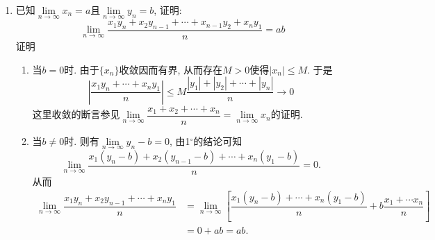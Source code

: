 \documentclass[UTF8,a4paper,20pt]{article}
\begin{document}
\begin{enumerate}
\item 已知$\lim\limits_{n\to\infty}x_n=a$且$\lim\limits_{n\to\infty}y_n=b$, 证明:
\[\lim\limits_{n\to\infty}\dfrac{x_1y_n+x_2y_{n-1}+\cdots+x_{n-1}y_2+x_ny_1}{n}=ab\]
{\heiti 证明}\\
\begin{enumerate}[1$^{\circ}$]
\item 当$b=0$时. 由于$\{x_n\}$收敛因而有界, 从而存在$M>0$使得$|x_n|\leqslant M$. 于是
\[ \left|\dfrac{x_1y_n+\cdots+x_ny_1}{n}\right|\leqslant M\dfrac{|y_1|+|y_2|+\cdots+|y_n|}{n}\to 0\]
这里收敛的断言参见$\lim\limits_{n\to\infty}\dfrac{x_1+x_2+\cdots+x_n}{n}=\lim\limits_{n\to\infty}x_n$的证明. 
\item 当$b\neq 0$时. 则有$\lim\limits_{n\to\infty}y_n-b=0$, 由1$^{\circ}$的结论可知
\[\lim\limits_{n\to\infty}\dfrac{x_1(y_n-b)+x_2(y_{n-1}-b)+\cdots+x_n(y_1-b)}{n}=0.\]
从而
\begin{equation*}
\begin{split}
\lim\limits_{n\to\infty}\dfrac{x_1y_n+x_2y_{n-1}+\cdots+x_ny_1}{n}&=\lim\limits_{n\to\infty}\left[\dfrac{x_1(y_n-b)+\cdots+x_n(y_1-b)}{n}+b\dfrac{x_1+\cdots x_n}{n}\right]\\&=0+ab=ab.
\end{split}
\end{equation*}
\end{enumerate}
\end{enumerate}

\clearpage
\end{document}
